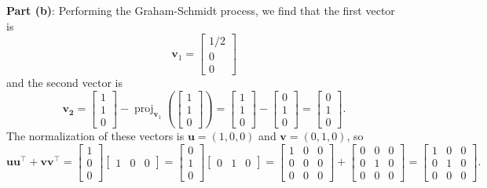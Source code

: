 \documentclass[11pt]{article}
\renewcommand{\vec}[1]{\mathbf{#1}}
\begin{document}
\textbf{Part (b)}: Performing the Graham-Schmidt process, we find that the first vector is
\[
	\vec{v}_{1} = \begin{bmatrix} 1/2 \\ 0 \\ 0 \end{bmatrix}
\]
and the second vector is 
\[
	\vec{v_{2}} = \begin{bmatrix} 1 \\ 1 \\ 0 \end{bmatrix} - \operatorname{proj}_{\vec{v}_{1}} \left( \begin{bmatrix} 1 \\ 1 \\ 0 \end{bmatrix} \right) = \begin{bmatrix} 1 \\ 1 \\ 0 \end{bmatrix} - \begin{bmatrix} 0 \\ 1 \\ 0 \end{bmatrix} = \begin{bmatrix} 0 \\ 1 \\ 0 \end{bmatrix}.
\]
The normalization of these vectors is $\vec{u} = (1, 0, 0)$ and $\vec{v} = (0, 1, 0)$, so
\[
	\vec{u}\vec{u}^{\top} + \vec{v} \vec{v}^{\top} = \begin{bmatrix} 1 \\ 0 \\ 0 \end{bmatrix} \begin{bmatrix} 1 & 0 & 0 \end{bmatrix} = \begin{bmatrix} 0 \\ 1 \\ 0 \end{bmatrix} \begin{bmatrix} 0 & 1 & 0 \end{bmatrix} = \begin{bmatrix} 1 & 0 & 0 \\ 0 & 0 & 0 \\ 0 & 0 & 0 \end{bmatrix} + \begin{bmatrix} 0 & 0 & 0 \\ 0 & 1 & 0 \\ 0 & 0 & 0 \end{bmatrix} = \boxed{ \begin{bmatrix} 1 & 0 & 0 \\ 0 & 1 & 0 \\ 0 & 0 & 0 \end{bmatrix}}.
\]
\end{document}

